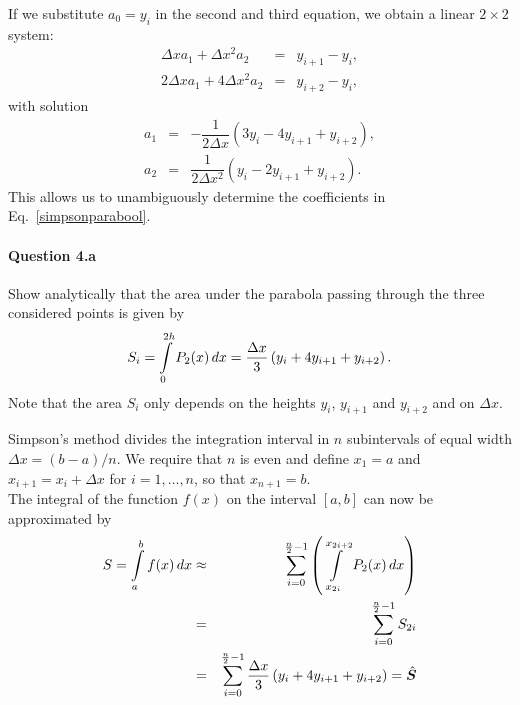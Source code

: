

If we substitute $a_0 = y_i$ in the second and third equation, we obtain a linear $2 \times 2$ system:
\begin{eqnarray*}
\Delta x a_1 + \Delta x^2 a_2 & = & y_{i+1} - y_i, \\
2 \Delta x a_1 + 4 \Delta x^2 a_2  & = & y_{i+2} - y_i,
\end{eqnarray*}
with solution
\begin{eqnarray*}
a_1 &=& - \dfrac{1}{2\Delta x}\left(3 y_i - 4 y_{i+1} + y_{i+2}  \right), \\
a_2 &=&  \dfrac{1}{2\Delta x^2}\left(y_i - 2 y_{i+1} + y_{i+2}  \right).
\end{eqnarray*}
This allows us to unambiguously determine the coefficients in Eq.~\eqref{simpsonparabool}.

\paragraph{Question 4.a}
Show analytically that the area under the parabola passing through the three considered points is given by
\[S_i = \displaystyle\int\limits_{0}^{2 h}{P_{2}(x)} \,dx = \dfrac{\Delta x}{3} \left( y_i + 4 y_{i+1} + y_{i+2} \right). \]
Note that the area $S_i$ only depends on the heights $y_i$, $y_{i+1}$ and $y_{i+2}$ and on $\Delta x$.


Simpson's method divides the integration interval in $n$ subintervals of equal width $\Delta x=(b-a)/n$. We require that $n$ is even and define $x_1 = a$ and $x_{i+1} = x_{i}+ \Delta x$ for $i = 1, \ldots, n$, so that $x_{n+1} = b$. \\
The integral of the function $f(x)$ on the interval $[a,b]$ can now be approximated by\
\begin{eqnarray*}
S =  \ds\int\limits_{a}^{b} f(x) \,dx  &\approx& \sum \limits_{i=0}^{\frac{n}{2}-1} \left(
\ds\int\limits_{x_{2i}}^{x_{2i+2}}{P_{2}(x)} \,dx \right) \\
&=& \sum \limits_{i=0}^{\frac{n}{2}-1} S_{2i} \\
&=&   \sum \limits_{i=0}^{\frac{n}{2}-1} \dfrac{\Delta x}{3} \left( y_i + 4 y_{i+1} + y_{i+2} \right) = \hat{S}
\end{eqnarray*}

